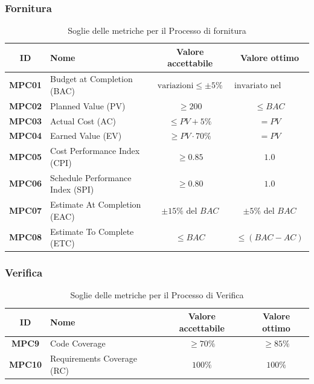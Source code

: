 \documentclass[a4paper,12pt]{article}
\begin{document}
\subsubsection{Fornitura}\label{sec:fornitura}
\begin{table}[H]
\centering
\renewcommand{\arraystretch}{1.5}
\begin{tabularx}{\textwidth}{|c|Y|c|c|}
\hline
{} \textbf{ID} & \textbf{Nome} & \textbf{Valore accettabile} & \textbf{Valore ottimo} \\ \hline
\textbf{MPC01} & Budget at Completion (BAC) & $\text{variazioni}\le \pm 5\%$ & $\text{invariato nel tempo}$ \\ \hline
\textbf{MPC02} & Planned Value (PV) & $\ge 200$ & $\le BAC$ \\ \hline
\textbf{MPC03} & Actual Cost (AC) & $\le PV + 5\%$ & $=PV$ \\ \hline
\textbf{MPC04} & Earned Value (EV) & $\ge PV \cdot 70\%$ & $=PV$ \\ \hline
\textbf{MPC05} & Cost Performance Index (CPI) & $\ge 0.85$ & $1.0$ \\ \hline
\textbf{MPC06} & Schedule Performance Index (SPI) & $\ge 0.80$ & $1.0$ \\ \hline
\textbf{MPC07} & Estimate At Completion (EAC) & $\pm 15\%$ del $BAC$ & $\pm 5\%$ del $BAC$ \\ \hline
\textbf{MPC08} & Estimate To Complete (ETC) & $\le BAC$ & $\le (BAC - AC)$ \\ \hline
\end{tabularx}
\caption{Soglie delle metriche per il Processo di fornitura}
\end{table}

\subsubsection{Verifica}\label{sec:verifica}
\begin{table}[H]
\centering
\renewcommand{\arraystretch}{1.5}
\begin{tabularx}{\textwidth}{|c|Y|c|c|}
\hline
{} \textbf{ID} & \textbf{Nome} & \textbf{Valore accettabile} & \textbf{Valore ottimo} \\ \hline
\textbf{MPC9} & Code Coverage & $\ge 70\%$ & $\ge 85\%$ \\ \hline
\textbf{MPC10} & Requirements Coverage (RC) & $100\%$ & $100\%$ \\ \hline
\end{tabularx}
\caption{Soglie delle metriche per il Processo di Verifica}
\end{table}
\end{document}
